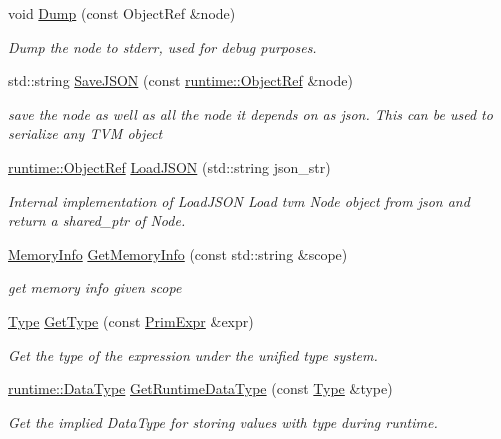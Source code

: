 \begin{DoxyCompactItemize}
void \hyperlink{namespacetvm_a23b1dfa894bd954c9a1eea4ab8199764}{Dump} (const Object\+Ref \&node)
\begin{DoxyCompactList}\small\item\em Dump the node to stderr, used for debug purposes. \end{DoxyCompactList}\item 
std\+::string \hyperlink{namespacetvm_aad98af358976b1598430090b7db92823}{Save\+J\+S\+ON} (const \hyperlink{classtvm_1_1runtime_1_1ObjectRef}{runtime\+::\+Object\+Ref} \&node)
\begin{DoxyCompactList}\small\item\em save the node as well as all the node it depends on as json. This can be used to serialize any T\+VM object \end{DoxyCompactList}\item 
\hyperlink{classtvm_1_1runtime_1_1ObjectRef}{runtime\+::\+Object\+Ref} \hyperlink{namespacetvm_afa0a9bdf3997ef4fad45b19fb1a655cd}{Load\+J\+S\+ON} (std\+::string json\+\_\+str)
\begin{DoxyCompactList}\small\item\em Internal implementation of Load\+J\+S\+ON Load tvm Node object from json and return a shared\+\_\+ptr of Node. \end{DoxyCompactList}\item 
\hyperlink{classtvm_1_1MemoryInfo}{Memory\+Info} \hyperlink{namespacetvm_a6e525343df6fbd739a45b291cb0dfb4f}{Get\+Memory\+Info} (const std\+::string \&scope)
\begin{DoxyCompactList}\small\item\em get memory info given scope \end{DoxyCompactList}\item 
\hyperlink{classtvm_1_1Type}{Type} \hyperlink{namespacetvm_a48fb9755f38ffcfcd03592a47ffbbd14}{Get\+Type} (const \hyperlink{classtvm_1_1PrimExpr}{Prim\+Expr} \&expr)
\begin{DoxyCompactList}\small\item\em Get the type of the expression under the unified type system. \end{DoxyCompactList}\item 
\hyperlink{classtvm_1_1runtime_1_1DataType}{runtime\+::\+Data\+Type} \hyperlink{namespacetvm_a0447e9aa45f6cab707f6dc9f9281b3f5}{Get\+Runtime\+Data\+Type} (const \hyperlink{classtvm_1_1Type}{Type} \&type)
\begin{DoxyCompactList}\small\item\em Get the implied Data\+Type for storing values with type during runtime. \end{DoxyCompactList}\item 

\end{DoxyCompactItemize}
